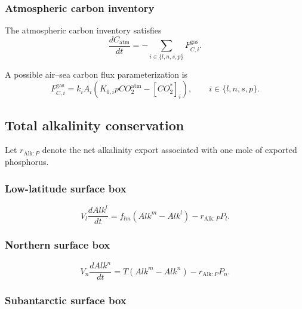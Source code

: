 \documentclass[11pt]{article}
\begin{document}
\subsubsection{Atmospheric carbon inventory}

The atmospheric carbon inventory satisfies
\begin{equation}
\frac{dC_{\mathrm{atm}}}{dt}
=
-
\sum_{i\in\{l,n,s,p\}}
F^{\mathrm{gas}}_{C,i}.
\label{eq:six_carbon_atmosphere}
\end{equation}

A possible air--sea carbon flux parameterization is
\begin{equation}
F^{\mathrm{gas}}_{C,i}
=
k_iA_i
\left(
K_{0,i}pCO_2^{\mathrm{atm}}
-
[CO_2^\ast]_i
\right),
\qquad
i\in\{l,n,s,p\}.
\label{eq:six_co2_gas_flux}
\end{equation}

\subsection{Total alkalinity conservation}

Let \(r_{\mathrm{Alk}:P}\) denote the net alkalinity export
associated with one mole of exported phosphorus.

\subsubsection{Low-latitude surface box}

\begin{equation}
V_l\frac{dAlk^l}{dt}
=
f_{lm}\left(Alk^m-Alk^l\right)
-
r_{\mathrm{Alk}:P}P_l.
\label{eq:six_alk_l}
\end{equation}

\subsubsection{Northern surface box}

\begin{equation}
V_n\frac{dAlk^n}{dt}
=
T\left(Alk^m-Alk^n\right)
-
r_{\mathrm{Alk}:P}P_n.
\label{eq:six_alk_n}
\end{equation}

\subsubsection{Subantarctic surface box}
\end{document}
